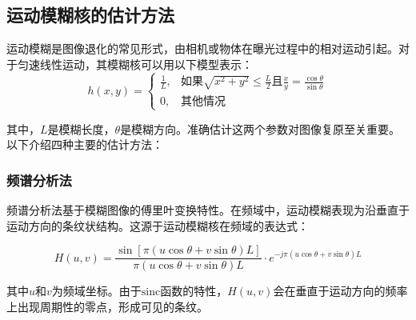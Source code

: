 \documentclass[a4paper,11pt,UTF8]{ctexart}
\begin{document}
\subsection{运动模糊核的估计方法}
运动模糊是图像退化的常见形式，由相机或物体在曝光过程中的相对运动引起。对于匀速线性运动，其模糊核可以用以下模型表示：
\begin{equation}
h(x,y) = 
\begin{cases}
\frac{1}{L}, & \text{如果} \sqrt{x^2 + y^2} \leq \frac{L}{2} \text{且} \frac{x}{y} = \frac{\cos\theta}{\sin\theta} \\
0, & \text{其他情况}
\end{cases}
\end{equation}

其中，$L$是模糊长度，$\theta$是模糊方向。准确估计这两个参数对图像复原至关重要。以下介绍四种主要的估计方法：

\subsubsection{频谱分析法}
频谱分析法基于模糊图像的傅里叶变换特性。在频域中，运动模糊表现为沿垂直于运动方向的条纹状结构。这源于运动模糊核在频域的表达式：

\begin{equation}
H(u,v) = \frac{\sin[\pi(u\cos\theta + v\sin\theta)L]}{\pi(u\cos\theta + v\sin\theta)L} \cdot e^{-j\pi(u\cos\theta + v\sin\theta)L}
\end{equation}

其中$u$和$v$为频域坐标。由于$\text{sinc}$函数的特性，$H(u,v)$会在垂直于运动方向的频率上出现周期性的零点，形成可见的条纹。
\end{document}
